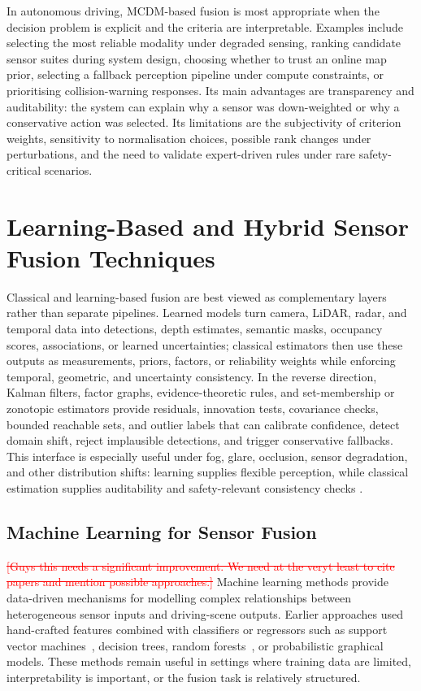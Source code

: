 \documentclass[11pt,oneside,openany]{book}
\newcommand{\deleted}[1]{\textcolor{red}{\sout{#1}}}
\newcommand{\addednew}[1]{\textcolor{RevisionOlive}{#1}}
\begin{document}
In autonomous driving, MCDM-based fusion is most appropriate when the decision problem is explicit and the criteria are interpretable. Examples include selecting the most reliable modality under degraded sensing, ranking candidate sensor suites during system design, choosing whether to trust an online map prior, selecting a fallback perception pipeline under compute constraints, or prioritising collision-warning responses. Its main advantages are transparency and auditability: the system can explain why a sensor was down-weighted or why a conservative action was selected. Its limitations are the subjectivity of criterion weights, sensitivity to normalisation choices, possible rank changes under perturbations, and the need to validate expert-driven rules under rare safety-critical scenarios.

\chapter{Learning-Based and Hybrid Sensor Fusion Techniques}
\label{sec:learning}
Classical and learning-based fusion are best viewed as complementary layers rather than separate pipelines. Learned models turn camera, LiDAR, radar, and temporal data into detections, depth estimates, semantic masks, occupancy scores, associations, or learned uncertainties; classical estimators then use these outputs as measurements, priors, factors, or reliability weights while enforcing temporal, geometric, and uncertainty consistency. In the reverse direction, Kalman filters, factor graphs, evidence-theoretic rules, and set-membership or zonotopic estimators provide residuals, innovation tests, covariance checks, bounded reachable sets, and outlier labels that can calibrate confidence, detect domain shift, reject implausible detections, and trigger conservative fallbacks. This interface is especially useful under fog, glare, occlusion, sensor degradation, and other distribution shifts: learning supplies flexible perception, while classical estimation supplies auditability and safety-relevant consistency checks \cite{khaleghi_multisensor_2013,baltrusaitis_multimodal_2019,li2022_gp_zkf}.


\section{Machine Learning for Sensor Fusion}
\deleted{[Guys this needs a significant improvement. We need at the veryt least to cite papers and mention possible approaches.]}
Machine learning methods provide data-driven mechanisms for modelling complex relationships between heterogeneous sensor inputs and driving-scene outputs. Earlier approaches used hand-crafted features combined with classifiers or regressors such as support vector machines\addednew{~\cite{cortes1995_svm}}, decision trees, random forests\addednew{~\cite{breiman2001_rf}}, or probabilistic graphical models. These methods remain useful in settings where training data are limited, interpretability is important, or the fusion task is relatively structured.
\end{document}
